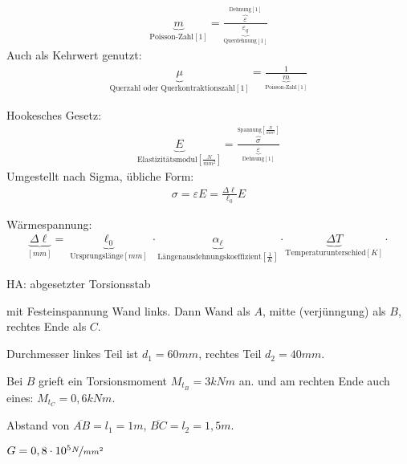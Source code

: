 \documentclass[11pt]{article}
\newcommand{\1}{ {\mathds{1}} }
\begin{document}
    \hrulefill
    \begin{align*}
        \underbrace{m}_{\text{Poisson-Zahl}[1]} = \frac{\overbrace{\varepsilon}^{\text{Dehnung} [1]}}{\underbrace{\varepsilon_q}_{\text{Querdehnung}[1]}}
    \end{align*}
    Auch als Kehrwert genutzt:
        \begin{align*}
        \underbrace{\mu}_{\text{Querzahl oder Querkontraktionszahl}[1]} = \frac{1}{\underbrace{m}_{\text{Poisson-Zahl}[1]}}
    \end{align*}

    \hrulefill
        
    Hookesches Gesetz:
    \begin{align*}
        \underbrace{E}_{\text{Elastizitätsmodul}\left[\frac{N}{mm^2}\right]}
        =
        \frac{\overbrace{\sigma}^{\text{Spannung}\left[\frac{N}{mm^2}\right]}}
        {\underbrace{\varepsilon}_{\text{Dehnung}\left[1\right]}}
    \end{align*}
Umgestellt nach Sigma, übliche Form:
    \begin{align*}
        \sigma
        =
        \varepsilon E
        =
        \frac{\Delta \ell}{\ell_0}E
    \end{align*}
    \hrulefill

    Wärmespannung:
    \begin{align*}
        \underbrace{\Delta \ell}_{\left[ mm \right]}
        =
        \underbrace{\ell_0}_{\text{Ursprungslänge}\left[mm\right]} \cdot
        \underbrace{\alpha_{\ell}}_{\text{Längenausdehnungskoeffizient}\left[\frac{1}{K}\right]} \cdot
        \underbrace{\Delta T}_{\text{Temperaturunterschied}\left[K\right]} \cdot
    \end{align*}
    \hrulefill
    
    \pagebreak
    HA: abgesetzter Torsionsstab

    mit Festeinspannung Wand links.
    Dann Wand als $A$, mitte (verjünngung) als $B$, rechtes Ende als $C$.

    Durchmesser linkes Teil ist $d_1=60mm$, rechtes Teil $d_2=40mm$.

    Bei $B$ grieft ein Torsionsmoment $M_{t_B} = 3 kNm$ an. und am rechten Ende auch eines: $M_{t_C} = 0,6 kNm$.

    Abstand von $\overline{AB} = l_1 = 1m$, $\overline{BC} = l_2 = 1,5m$.

    $G = 0,8 \cdot 10^5 \nicefrac{N}{mm^2}$
    
    \hrulefill
    
\end{document}
